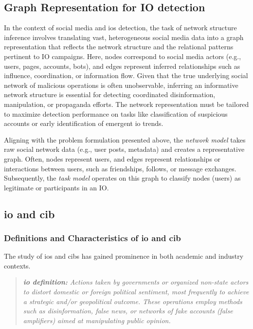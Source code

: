 \documentclass{article}
\begin{document}
\subsection{Graph Representation for  IO detection} 
In the context of social media and \acp{io} detection, the task of network structure inference involves translating vast, heterogeneous social media data into a graph representation that reflects the network structure and the relational patterns pertinent to IO campaigns. Here, nodes correspond to social media actors (e.g., users, pages, accounts, bots), and edges represent inferred relationships such as influence, coordination, or information flow. Given that the true underlying social network of malicious operations is often unobservable, inferring an informative network structure is essential for detecting coordinated disinformation, manipulation, or propaganda efforts. The network representation must be tailored to maximize detection performance on tasks like classification of suspicious accounts or early identification of emergent \ac{io} trends. 

Aligning with the problem formulation presented above, the \textit{network model} takes raw social network data (e.g., user posts, metadata) and creates a representative graph. Often, nodes represent users, and edges represent relationships or interactions between users, such as friendships, follows, or message exchanges. Subsequently, the \textit{task model} operates on this graph to classify nodes (users) as legitimate or participants in an IO.

\subsection{\Acl{io} and \Acl{cib}}

\subsubsection{Definitions and Characteristics of \Acl{io} and \Acl{cib}}

The study of \acp{io} and \acp{cib} has gained prominence in both academic and industry contexts.

\begin{quote}
  \textit{\textbf{\ac{io} definition:} Actions taken by governments or organized non-state
  actors to distort domestic or foreign political sentiment, most frequently to achieve a strategic
  and/or geopolitical outcome. These operations employ methods such as disinformation, false
  news, or networks of fake accounts (false amplifiers) aimed at manipulating public
  opinion.} \cite{weedon2017information}
\end{quote}
\end{document}
